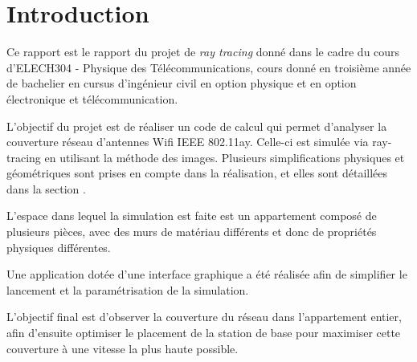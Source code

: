 \chapter*{Introduction}
\label{introduction}
Ce rapport est le rapport du projet de \textit{ray tracing} donné dans le cadre du cours d'ELECH304 - Physique des Télécommunications, cours donné en troisième année de bachelier en cursus d'ingénieur civil en option physique et en option électronique et télécommunication.

L'objectif du projet est de réaliser un code de calcul qui permet d'analyser la couverture réseau d'antennes Wifi IEEE 802.11ay.
Celle-ci est simulée via ray-tracing en utilisant la méthode des images. Plusieurs simplifications physiques et géométriques sont prises en compte dans la réalisation, et elles sont détaillées dans la section .

L'espace dans lequel la simulation est faite est un appartement composé de plusieurs pièces, avec des murs de matériau différents et donc de propriétés physiques différentes.

Une application dotée d'une interface graphique a été réalisée afin de simplifier le lancement et la paramétrisation de la simulation.

L'objectif final est d'observer la couverture du réseau dans l'appartement entier, afin d'ensuite optimiser le placement de la station de base pour maximiser cette couverture à une vitesse la plus haute possible.%
